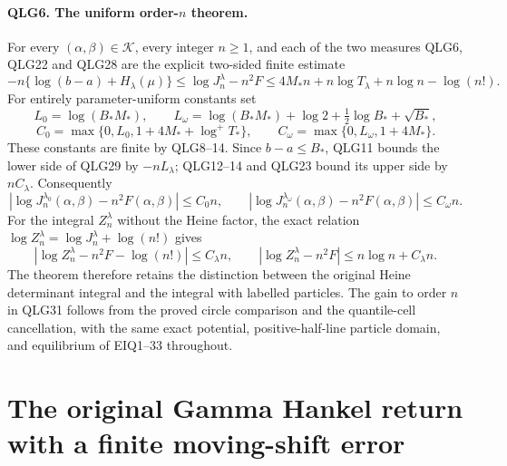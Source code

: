 \documentclass[11pt,a4paper]{article}
\begin{document}
\paragraph{QLG6. The uniform order-\(n\) theorem.}
For every \((\alpha,\beta)\in\mathcal K\), every integer \(n\geq1\),
and each of the two measures QLG6, QLG22 and QLG28 are the explicit
two-sided finite estimate
\[
 \boxed{
 -n\{\log(b-a)+H_\lambda(\mu)\}
 \leq\log J_n^\lambda-n^2F
 \leq 4M_*n+n\log T_\lambda+n\log n-\log(n!).}
 \tag{QLG29}
\]
For entirely parameter-uniform constants set
\[
 L_0=\log(B_*M_*),\qquad
 L_\omega=\log(B_*M_*)+\log2+\tfrac12\log B_*+\sqrt{B_*},
\]
\[
 C_0=\max\{0,L_0,1+4M_*+\log^+T_*\},\qquad
 C_\omega=\max\{0,L_\omega,1+4M_*\}.
 \tag{QLG30}
\]
These constants are finite by QLG8--14. Since \(b-a\leq B_*\),
QLG11 bounds the lower side of QLG29 by \(-nL_\lambda\); QLG12--14
and QLG23 bound its upper side by \(nC_\lambda\). Consequently
\[
 \boxed{\left|\log J_n^{\lambda_0}(\alpha,\beta)
                 -n^2F(\alpha,\beta)\right|\leq C_0n,
 \qquad
 \left|\log J_n^{\lambda_\omega}(\alpha,\beta)
                 -n^2F(\alpha,\beta)\right|\leq C_\omega n.}
 \tag{QLG31}
\]
For the integral \(Z_n^\lambda\) without the Heine factor, the exact
relation \(\log Z_n^\lambda=\log J_n^\lambda+\log(n!)\) gives
\[
 \left|\log Z_n^\lambda-n^2F-\log(n!)\right|\leq C_\lambda n,
 \qquad
 \left|\log Z_n^\lambda-n^2F\right|
                         \leq n\log n+C_\lambda n.
 \tag{QLG32}
\]
The theorem therefore retains the distinction between the original
Heine determinant integral and the integral with labelled particles.
The gain to order \(n\) in QLG31 follows from the proved circle
comparison and the quantile-cell cancellation, with the same exact
potential, positive-half-line particle domain, and equilibrium of
EIQ1--33 throughout.


\clearpage

\section{The original Gamma Hankel return with a finite moving-shift error}
\label{sec:QGT}
\end{document}

